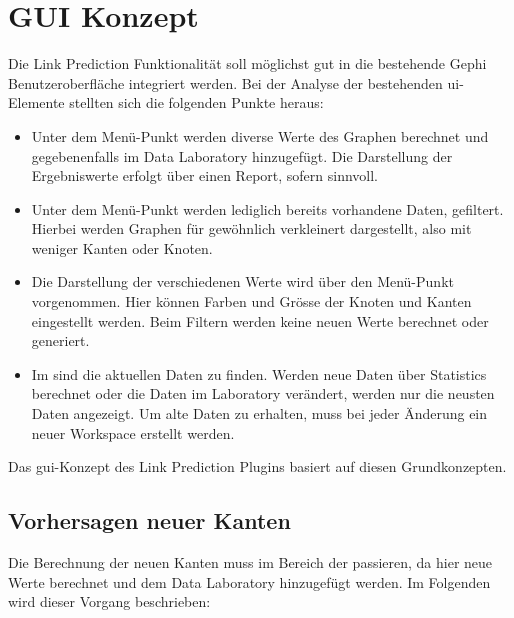 \section{GUI Konzept}

Die Link Prediction Funktionalität soll möglichst gut in die bestehende Gephi Benutzeroberfläche integriert werden.
Bei der Analyse der bestehenden \acs{ui}-Elemente stellten sich die folgenden Punkte heraus:

\begin{itemize}
    \item Unter dem Menü-Punkt  werden diverse Werte des Graphen berechnet und gegebenenfalls im Data Laboratory
          hinzugefügt. Die Darstellung der Ergebniswerte erfolgt über einen Report, sofern sinnvoll.
    \item Unter dem Menü-Punkt  werden lediglich bereits vorhandene Daten, gefiltert. Hierbei werden Graphen für gewöhnlich verkleinert dargestellt, also mit weniger Kanten oder Knoten.
    \item Die Darstellung der verschiedenen Werte wird über den Menü-Punkt  vorgenommen. Hier können Farben
          und Grösse der Knoten und Kanten eingestellt werden. Beim Filtern werden keine neuen Werte berechnet oder generiert.
    \item Im  sind die aktuellen Daten zu finden. Werden neue Daten über Statistics berechnet
          oder die Daten im Laboratory verändert, werden nur die neusten Daten angezeigt. Um alte Daten zu erhalten,
          muss bei jeder Änderung ein neuer Workspace erstellt werden.
\end{itemize}

Das \acs{gui}-Konzept des Link Prediction Plugins basiert auf diesen Grundkonzepten.

\subsection{Vorhersagen neuer Kanten}

Die Berechnung der neuen Kanten muss im Bereich der  passieren, da hier neue Werte berechnet und dem
Data Laboratory hinzugefügt werden. Im Folgenden wird dieser Vorgang beschrieben:

